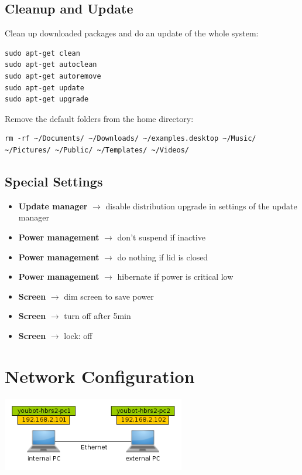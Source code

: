 \documentclass[a4paper,12pt]{article}
\begin{document}
\subsection{Cleanup and Update}
Clean up downloaded packages and do an update of the whole system:
\begin{lstlisting}
sudo apt-get clean
sudo apt-get autoclean
sudo apt-get autoremove
sudo apt-get update
sudo apt-get upgrade
\end{lstlisting}

Remove the default folders from the home directory:
\begin{lstlisting}
rm -rf ~/Documents/ ~/Downloads/ ~/examples.desktop ~/Music/ ~/Pictures/ ~/Public/ ~/Templates/ ~/Videos/
\end{lstlisting}


\subsection{Special Settings}
\begin{itemize}
	\item \textbf{Update manager} $\rightarrow$ disable distribution upgrade in settings of the update manager
	\item \textbf{Power management} $\rightarrow$ don't suspend if inactive	
	\item \textbf{Power management} $\rightarrow$ do nothing if lid is closed
	\item \textbf{Power management} $\rightarrow$ hibernate if power is critical low
	\item \textbf{Screen} $\rightarrow$ dim screen to save power
	\item \textbf{Screen} $\rightarrow$ turn off after 5min
	\item \textbf{Screen} $\rightarrow$ lock: off	
\end{itemize}



\newpage
\section{Network Configuration}
\begin{center}
	\includegraphics[width=0.60\textwidth]{gfx/network.png}
\end{center}
\end{document}
